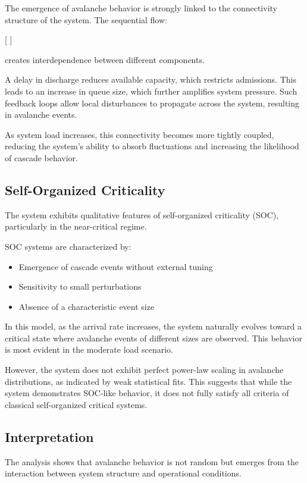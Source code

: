 \documentclass[11pt]{article}
\begin{document}
The emergence of avalanche behavior is strongly linked to the connectivity structure of the system. The sequential flow:

[
 \rightarrow {} \rightarrow {} \rightarrow {}
]

creates interdependence between different components.

A delay in discharge reduces available capacity, which restricts admissions. This leads to an increase in queue size, which further amplifies system pressure. Such feedback loops allow local disturbances to propagate across the system, resulting in avalanche events.

As system load increases, this connectivity becomes more tightly coupled, reducing the system's ability to absorb fluctuations and increasing the likelihood of cascade behavior.

\subsection{Self-Organized Criticality}

The system exhibits qualitative features of self-organized criticality (SOC), particularly in the near-critical regime.

SOC systems are characterized by:
\begin{itemize}
\item Emergence of cascade events without external tuning
\item Sensitivity to small perturbations
\item Absence of a characteristic event size
\end{itemize}

In this model, as the arrival rate increases, the system naturally evolves toward a critical state where avalanche events of different sizes are observed. This behavior is most evident in the moderate load scenario.

However, the system does not exhibit perfect power-law scaling in avalanche distributions, as indicated by weak statistical fits. This suggests that while the system demonstrates SOC-like behavior, it does not fully satisfy all criteria of classical self-organized critical systems.

\subsection{Interpretation}

The analysis shows that avalanche behavior is not random but emerges from the interaction between system structure and operational conditions.
\end{document}
